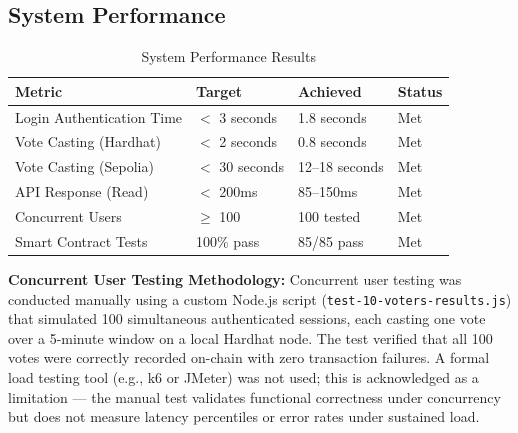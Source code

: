 \documentclass[oneside,a4paper,12pt]{book}
\begin{document}
\subsection{System Performance}
\begin{table}[htbp]
\centering
\renewcommand{\arraystretch}{1.3}
\small
\begin{tabularx}{\textwidth}{|X|p{3cm}|p{3cm}|p{2cm}|}
\hline
\textbf{Metric} & \textbf{Target} & \textbf{Achieved} & \textbf{Status} \\
\hline
Login Authentication Time & $<$ 3 seconds & 1.8 seconds & Met \\
\hline
Vote Casting (Hardhat) & $<$ 2 seconds & 0.8 seconds & Met \\
\hline
Vote Casting (Sepolia) & $<$ 30 seconds & 12--18 seconds & Met \\
\hline
API Response (Read) & $<$ 200ms & 85--150ms & Met \\
\hline
Concurrent Users & $\geq$ 100 & 100 tested & Met \\
\hline
Smart Contract Tests & 100\% pass & 85/85 pass & Met \\
\hline
\end{tabularx}
\caption{System Performance Results}
\label{tab:performance}
\end{table}

\textbf{Concurrent User Testing Methodology:} Concurrent user testing was conducted manually using a custom Node.js script (\texttt{test-10-voters-results.js}) that simulated 100 simultaneous authenticated sessions, each casting one vote over a 5-minute window on a local Hardhat node. The test verified that all 100 votes were correctly recorded on-chain with zero transaction failures. A formal load testing tool (e.g., k6 or JMeter) was not used; this is acknowledged as a limitation --- the manual test validates functional correctness under concurrency but does not measure latency percentiles or error rates under sustained load.
\end{document}
